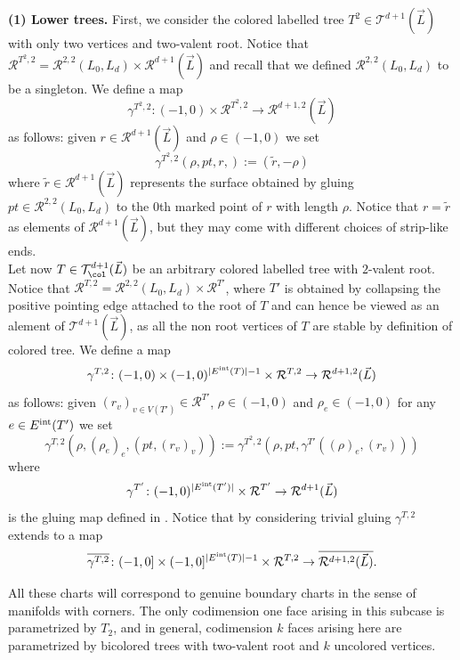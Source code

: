 	\textbf{(1) Lower trees.} First, we consider the colored labelled tree $T^2\in \mathcal{T}^{d+1}(\vec{L})$ with only two vertices and two-valent root. Notice that $\mathcal{R}^{T^2,2}=\mathcal{R}^{2,2}(L_0,L_d)\times \mathcal{R}^{d+1}(\vec{L})$ and recall that we defined $\mathcal{R}^{2,2}(L_0,L_d)$ to be a singleton. We define a map $$\gamma^{T^2,2}\colon(-1,0)\times \mathcal{R}^{T^2,2}\to \mathcal{R}^{d+1,2}(\vec{L})$$ as follows: given $r\in \mathcal{R}^{d+1}(\vec{L})$ and $\rho\in (-1,0)$ we set $$\gamma^{T^2,2}(\rho, pt,r,):=(\tilde{r},-\rho)$$ where $\tilde{r}\in \mathcal{R}^{d+1}(\vec{L})$ represents the surface obtained by gluing $pt\in \mathcal{R}^{2,2}(L_0,L_d)$ to the $0$th marked point of $r$ with length $\rho$. Notice that $r=\tilde{r}$ as elements of $\mathcal{R}^{d+1}(\vec{L})$, but they may come with different choices of strip-like ends. \\
	Let now $T\in \mathcal{T}^{d+1}_\col(\vec{L})$ be an arbitrary colored labelled tree with $2$-valent root. Notice that $\mathcal{R}^{T,2}= \mathcal{R}^{2,2}(L_0,L_d)\times \mathcal{R}^{T'}$, where $T'$ is obtained by collapsing the positive pointing edge attached to the root of $T$ and can hence be viewed as an alement of $\mathcal{T}^{d+1}(\vec{L})$, as all the non root vertices of $T$ are stable by definition of colored tree. We define a map $$\gamma^{T,2}\colon (-1,0)\times (-1,0)^{|E^\textnormal{int}(T)|-1}\times \mathcal{R}^{T,2}\to \mathcal{R}^{d+1,2}(\vec{L})$$ as follows: given $(r_v)_{v\in V(T')}\in \mathcal{R}^{T'}$, $\rho\in (-1,0)$ and $\rho_e\in (-1,0)$ for any $e\in E^\textnormal{int}(T')$ we set $$\gamma^{T,2}\left(\rho, (\rho_e)_e, (pt, (r_v)_v)\right):=\gamma^{T^2,2}\left(\rho, pt, \gamma^{T'}((\rho)_e, (r_v))\right)$$ where $$\gamma^{T'}\colon (-1,0)^{|E^\textnormal{int}(T')|}\times \mathcal{R}^{T'}\to \mathcal{R}^{d+1}(\vec{L})$$ is the gluing map defined in \cite{Se:book-fukaya-categ}. Notice that by considering trivial gluing $\gamma^{T,2}$ extends to a map $$\overline{\gamma^{T,2}}\colon (-1,0]\times (-1,0]^{|E^\textnormal{int}(T)|-1}\times \mathcal{R}^{T,2}\to \overline{\mathcal{R}^{d+1,2}(\vec{L})}.$$
	\begin{rem}
		All these charts will correspond to genuine boundary charts in the sense of manifolds with corners. The only codimension one face arising in this subcase is parametrized by $T_2$, and in general, codimension $k$ faces arising here are parametrized by bicolored trees with two-valent root and $k$ uncolored vertices.
	\end{rem}
	
